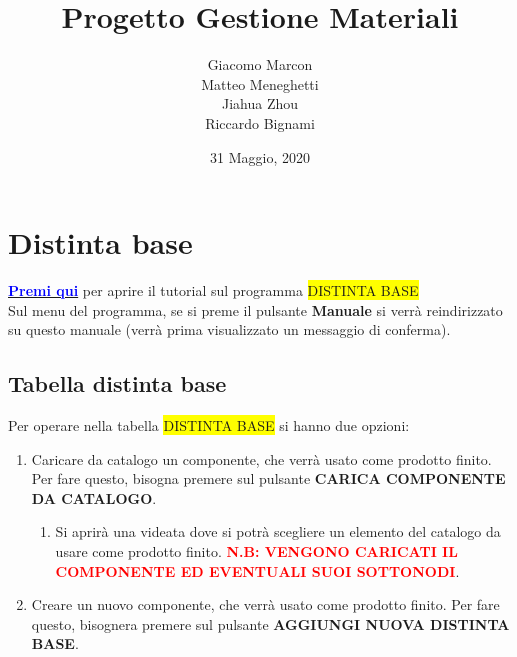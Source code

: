 \documentclass[12pt,twoside]{report}
\newcommand{\coloredbold}[2]{\textcolor{#1}{\textbf{#2}}}
\begin{document}
\title{Progetto Gestione Materiali}
\author
{
	Giacomo Marcon
	\\ Matteo Meneghetti  
	\\ Jiahua Zhou
	\\ Riccardo Bignami
}
\date{31 Maggio, 2020}
\maketitle

\newpage
\tableofcontents{}  

\chapter{Distinta base}   

\href{https://drive.google.com/open?id=1d0CVoRVsHYG7N_JXdQtYWLb9cYghqrsq}{\coloredbold{blue}{Premi qui}} per aprire il tutorial sul programma \colorbox{yellow}{DISTINTA BASE}\\

Sul menu del programma, se si preme il pulsante \textbf{Manuale} si verrà reindirizzato su questo manuale (verrà prima visualizzato un messaggio di conferma).


\section{Tabella distinta base}

Per operare nella tabella \colorbox{yellow}{DISTINTA BASE} si hanno due opzioni: 

\begin{enumerate}
	
	\item Caricare da catalogo un componente, che verrà usato come prodotto finito. Per fare questo, bisogna premere sul pulsante \textbf{CARICA COMPONENTE DA CATALOGO}.
	      	
	      \begin{enumerate}
	      	
	      	\item Si aprirà una videata dove si potrà scegliere un elemento del catalogo da usare come prodotto finito.
	      	      \coloredbold{red}{N.B: VENGONO CARICATI IL COMPONENTE ED EVENTUALI SUOI SOTTONODI}.
	      	      
	      \end{enumerate}
	      
	\item Creare un nuovo componente, che verrà usato come prodotto finito. Per fare questo, bisognera premere sul pulsante \textbf{AGGIUNGI NUOVA DISTINTA BASE}.
	      	
\end{enumerate}
\end{document}

